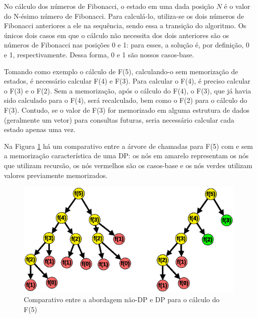       No cálculo dos números de Fibonacci, o estado em uma dada posição $N$ é o valor do N-ésimo número de Fibonacci. Para calculá-lo, utiliza-se os dois números de Fibonacci anteriores a ele na sequência, sendo essa a transição do algoritmo. Os únicos dois casos em que o cálculo não necessita dos dois anteriores são os números de Fibonacci nas posições 0 e 1: para esses, a solução é, por definição, 0 e 1, respectivamente. Dessa forma, 0 e 1 são nossos casos-base.

      Tomando como exemplo o cálculo de F(5), calculando-o sem memorização de estados, é necessário calcular F(4) e F(3). Para calcular o F(4), é preciso calcular o F(3) e o F(2). Sem a memorização, após o cálculo do F(4), o F(3), que já havia sido calculado para o F(4), será recalculado, bem como o F(2) para o cálculo do F(3). Contudo, se o valor de F(3) for memorizado em alguma estrutura de dados (geralmente um vetor) para consultas futuras, seria necessário calcular cada estado apenas uma vez.

      Na Figura \ref{nodpxdp} há um comparativo entre a árvore de chamadas para F(5) com e sem a memorização característica de uma DP: os nós em amarelo representam os nós que utilizam recursão, os nós vermelhos são os casos-base e os nós verdes utilizam valores previamente memorizados.

      \begin{figure}[htb]
        \centering
        \includegraphics[scale=0.5]{figuras/nodpxdp.eps}
        \caption{Comparativo entre a abordagem não-DP e DP para o cálculo do F(5)}
        \label{nodpxdp}
      \end{figure}
